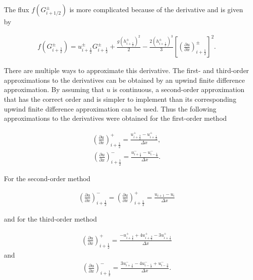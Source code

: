 \documentclass[SingleSpace,12pt,Proceedings]{Serre_ASCE}
\begin{document}
The flux $f(G^\pm_{i + 1/2})$ is more complicated because of the derivative and is given by
\begin{linenomath*}
\begin{gather*} %
f\left(G^\pm_{i + \frac{1}{2}}\right)= u^\pm_{i + \frac{1}{2}} G^\pm_{i + \frac{1}{2}} + \frac{g \left(h^\pm_{i + \frac{1}{2}} \right)^2}{2} - \frac{2 \left(h^\pm_{i + \frac{1}{2}} \right)^3}{3} \left[\left(\frac{\partial u}{\partial x}\right)^\pm_{i + \frac{1}{2}}\right]^2.
\end{gather*}
\end{linenomath*}
There are multiple ways to approximate this derivative. The first- and third-order approximations to the derivatives can be obtained by an upwind finite difference approximation. By assuming that $u$ is continuous, a second-order approximation that has the correct order and is simpler to implement than its corresponding upwind finite difference approximation can be used. Thus the following approximations to the derivatives were obtained for the first-order method
\begin{linenomath*}
\begin{gather*} %
\left(\frac{\partial u}{\partial x}\right)^+_{i + \frac{1}{2}} = \frac{ u^+_{i + \frac{3}{2}} - u^+_{i + \frac{1}{2}}}{\Delta x},
\end{gather*}
\begin{gather*}\label{eq:derivdisco1m}
\left(\frac{\partial u}{\partial x}\right)^-_{i + \frac{1}{2}} = \frac{ u^-_{i + \frac{1}{2}} - u^-_{i - \frac{1}{2}}}{\Delta x}.
\end{gather*}
\end{linenomath*}
For the second-order method
\begin{linenomath*}
\begin{gather*} %
\left(\frac{\partial u}{\partial x}\right)^-_{i + \frac{1}{2}} = \left(\frac{\partial u}{\partial x}\right)^+_{i + \frac{1}{2}} = \frac{u_{i + 1} - u_{i}}{\Delta x}
\end{gather*}
\end{linenomath*}
and for the third-order method
\begin{linenomath*}
\begin{gather*} %
\left(\frac{\partial u}{\partial x}\right)^+_{i + \frac{1}{2}} = \frac{ -u^+_{i + \frac{3}{2}} + 4u^+_{i + \frac{3}{2}}  -3 u^+_{i + \frac{1}{2}}}{\Delta x}
\end{gather*}
and
\begin{gather*} %
\left(\frac{\partial u}{\partial x}\right)^-_{i + \frac{1}{2}} = \frac{ 3u^-_{i + \frac{1}{2}} - 4u^-_{i - \frac{1}{2}} + u^-_{i - \frac{3}{2}}}{\Delta x}.
\end{gather*}
\end{linenomath*}
\end{document}
